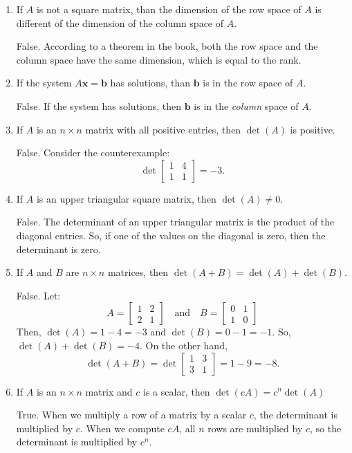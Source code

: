\documentclass[12pt]{article}
\begin{document}
\begin{enumerate}
\item If $A$ is not a square matrix, than the dimension of the row space of $A$ is different of the dimension of the column space of $A$.

False. According to a theorem in the book, both the row space and the column space have the same dimension, which is equal to the rank.

\item If the system $A\mathbf{x}=\mathbf{b}$ has solutions, than $\mathbf{b}$ is in the row space of $A$.

False. If the system has solutions, then $\mathbf{b}$ is in the \emph{column} space of $A$.

\item If $A$ is an $n\times n$ matrix with all positive entries, then $\det(A)$ is positive.

False. Consider the counterexample:
\[
\det
\begin{bmatrix}1&4\\1&1\end{bmatrix}=-3.
\]

\item If $A$ is an upper triangular square matrix, then $\det(A)\ne0$.

False. The determinant of an upper triangular matrix is the product of the diagonal entries. So, if one of the values on the diagonal is zero, then the determinant is zero.

\item If $A$ and $B$ are $n\times n$ matrices, then $\det(A+B)=\det(A)+\det(B)$.

False. Let:
\[
A=\begin{bmatrix}1&2\\2&1\end{bmatrix}\quad\text{and}\quad B=\begin{bmatrix}0&1\\1&0\end{bmatrix}
\]
Then, $\det(A)=1-4=-3$ and $\det(B)=0-1=-1$. So, $\det(A)+\det(B)=-4$. On the other hand,
\[
\det(A+B)=\det\begin{bmatrix}1&3\\3&1\end{bmatrix}=1-9=-8.
\]

\item If $A$ is an $n\times n$ matrix and $c$ is a scalar, then $\det(cA)=c^n\det(A)$

True. When we multiply a row of a matrix by a scalar $c$, the determinant is multiplied by $c$. When we compute $cA$, all $n$ rows are multiplied by $c$, so the determinant is multiplied by $c^n$.


\end{enumerate}
\end{document}
